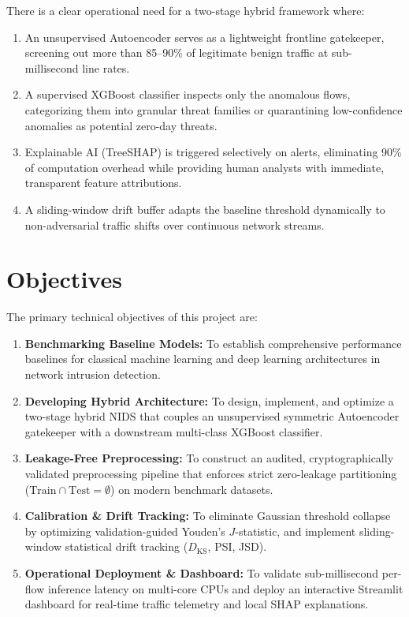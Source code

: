 \documentclass[12pt,a4paper]{report}
\begin{document}
There is a clear operational need for a two-stage hybrid framework where:
\begin{enumerate}
    \item An unsupervised Autoencoder serves as a lightweight frontline gatekeeper, screening out more than 85--90\% of legitimate benign traffic at sub-millisecond line rates.
    \item A supervised XGBoost classifier inspects only the anomalous flows, categorizing them into granular threat families or quarantining low-confidence anomalies as potential zero-day threats.
    \item Explainable AI (TreeSHAP) is triggered selectively on alerts, eliminating 90\% of computation overhead while providing human analysts with immediate, transparent feature attributions.
    \item A sliding-window drift buffer adapts the baseline threshold dynamically to non-adversarial traffic shifts over continuous network streams.
\end{enumerate}

\section{Objectives}
The primary technical objectives of this project are:
\begin{enumerate}
    \item \textbf{Benchmarking Baseline Models:} To establish comprehensive performance baselines for classical machine learning and deep learning architectures in network intrusion detection.
    \item \textbf{Developing Hybrid Architecture:} To design, implement, and optimize a two-stage hybrid NIDS that couples an unsupervised symmetric Autoencoder gatekeeper with a downstream multi-class XGBoost classifier.
    \item \textbf{Leakage-Free Preprocessing:} To construct an audited, cryptographically validated preprocessing pipeline that enforces strict zero-leakage partitioning ($\text{Train} \cap \text{Test} = \emptyset$) on modern benchmark datasets.
    \item \textbf{Calibration \& Drift Tracking:} To eliminate Gaussian threshold collapse by optimizing validation-guided Youden's $J$-statistic, and implement sliding-window statistical drift tracking ($D_{\text{KS}}$, PSI, JSD).
    \item \textbf{Operational Deployment \& Dashboard:} To validate sub-millisecond per-flow inference latency on multi-core CPUs and deploy an interactive Streamlit dashboard for real-time traffic telemetry and local SHAP explanations.
\end{enumerate}
\end{document}
